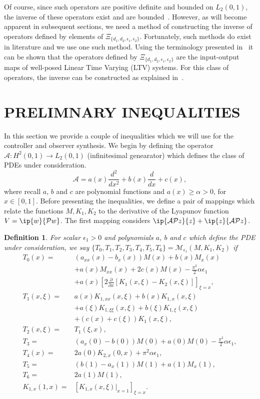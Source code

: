 \documentclass[US letter, 9 pt, conference]{ieeeconf}  \usepackage{setspace}
\newtheorem{definition}{Definition}
\newcommand{\pfx}{\frac{\partial}{\partial x}}
\newcommand{\lt}{L_2(0,1)}
\newcommand{\mcl}[1]{\mathcal{#1}}
\begin{document}
Of course, since such operators are positive definite and bounded on $\lt$, the inverse of these operators exist and are bounded~\cite{kreyszig1989introductory}. However, as will become apparent in subsequent sections, we need a method of constructing the inverse of operators defined by elements of $\Xi_{\{d_1,d_2,\epsilon_1,\epsilon_2\}}$. Fortunately, such methods do exist in literature and we use one such method. Using the terminology presented in~\cite{gohberg1984time} it can be shown that the operators defined by $\Xi_{\{d_1,d_2,\epsilon_1,\epsilon_2\}}$ are the input-output maps of well-posed Linear Time Varying (LTV) systems. For this class of operators, the inverse can be constructed as explained in~\cite{gohberg1984time}.
\section{PRELIMNARY INEQUALITIES}\label{sec:prelim}
In this section we provide a couple of inequalities which we will use for the controller and observer synthesis. We begin by defining the operator $\mcl{A}:H^2(0,1) \rightarrow \lt$ (infinitesimal genearator) which defines the class of PDEs under consideration.
\begin{equation}\label{eqn:A_prelim}
\mcl{A}=a(x)\frac{d^2}{dx^2} +b(x)\frac{d}{dx} +c(x),
\end{equation} where recall $a$, $b$ and $c$ are polynomial functions and $a(x) \geq \alpha >0$, for $x \in [0,1]$. Before presenting the inequalities, we define a pair of mappings which relate the functions $M,K_1,K_2$ to the derivative of the Lyapunov function $V=\ip{w}{\mathcal{P}w}$. The first mapping considers $\ip{\mcl{AP}z}{z}+\ip{z}{\mcl{AP}z}$.
\begin{definition}\label{def:dual}
For scalar $\epsilon_1>0$ and polynomials $a$, $b$ and $c$ which define the PDE under consideration, we say $\{T_0,T_1,T_2,T_3,T_4,T_5,T_6\}=\mcl{M}_{\epsilon_1}\left(M,K_1,K_2\right)$ if
\begin{align*}
T_0(x)=&\left(a_{xx}(x)-b_x(x) \right)M(x)+b(x)M_x(x) \\
&+a(x)M_{xx}(x)+2c(x)M(x)-\frac{\pi^2}{2}\alpha \epsilon_1\\
&+a(x) \left[2\pfx \left[K_1(x,\xi)-K_2(x,\xi) \right] \right]_{\xi=x}, \\
T_1(x,\xi)=&a(x)K_{1,xx}(x,\xi)+b(x)K_{1,x}(x,\xi) \\
&+a(\xi)K_{1,\xi\xi}(x,\xi)+b(\xi)K_{1,\xi}(x,\xi)\\
&+\left(c(x)+c(\xi) \right)K_1(x,\xi),\\
T_2(x,\xi)=&T_1(\xi,x),\\
T_3=&\left(a_x(0)-b(0) \right)M(0)+a(0)M(0)-\frac{\pi^2}{2}\alpha \epsilon_1,\\
T_4(x)=&2a(0)K_{2,x}(0,x)+\pi^2 \alpha \epsilon_1,\\
T_5=&\left(b(1)-a_x(1) \right)M(1)+a(1)M_x(1) ,\\
T_6=&2a(1)M(1),\\
K_{1,x}(1,x)=& \left[K_{1,x}(x,\xi)|_{x=1} \right]_{\xi=x}.
\end{align*}
\end{definition}
\end{document}
